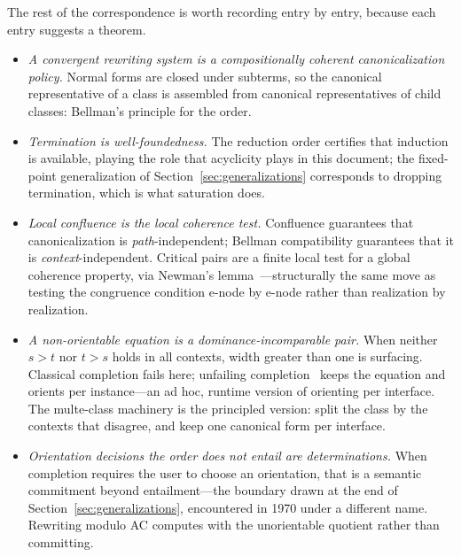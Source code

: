 \documentclass[sigconf,nonacm]{acmart}
\theoremstyle{definition}
\theoremstyle{plain}
\theoremstyle{remark}
\begin{document}
The rest of the correspondence is worth recording entry by entry,
because each entry suggests a theorem.

\begin{itemize}

\item
\emph{A convergent rewriting system is a compositionally coherent
canonicalization policy.}  Normal forms are closed under subterms,
so the canonical representative of a class is assembled from
canonical representatives of child classes: Bellman's principle for
the order.

\item
\emph{Termination is well-foundedness.}  The reduction order
certifies that induction is available, playing the role that
acyclicity plays in this document; the fixed-point generalization of
Section~\ref{sec:generalizations} corresponds to dropping
termination, which is what saturation does.

\item
\emph{Local confluence is the local coherence test.}  Confluence
guarantees that canonicalization is \emph{path}-independent; Bellman
compatibility guarantees that it is \emph{context}-independent.
Critical pairs are a finite local test for a global coherence
property, via Newman's lemma~\cite{newman1942}---structurally the
same move as testing the congruence condition e-node by e-node
rather than realization by realization.

\item
\emph{A non-orientable equation is a dominance-incomparable pair.}
When neither $s>t$ nor $t>s$ holds in all contexts, width greater
than one is surfacing.  Classical completion fails here; unfailing
completion~\cite{bachmair1989completion} keeps the equation and
orients per instance---an ad hoc, runtime version of orienting per
interface.  The multe-class machinery is the principled version:
split the class by the contexts that disagree, and keep one
canonical form per interface.

\item
\emph{Orientation decisions the order does not entail are
determinations.}  When completion requires the user to choose an
orientation, that is a semantic commitment beyond entailment---the
boundary drawn at the end of Section~\ref{sec:generalizations},
encountered in 1970 under a different name.  Rewriting modulo AC
computes with the unorientable quotient rather than committing.

\end{itemize}
\end{document}
